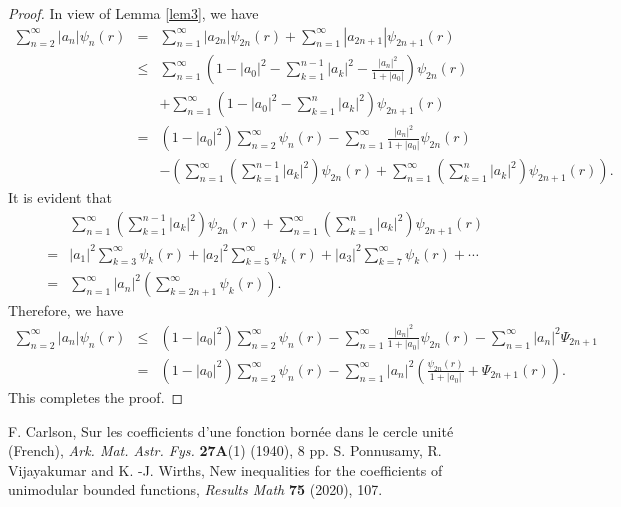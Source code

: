 \documentclass[10pt,a4paper]{amsart}
\newcommand{\beas}{\begin{eqnarray*}}
\newcommand{\eeas}{\end{eqnarray*}}
\begin{document}
\begin{proof} In view of \textrm{Lemma \ref{lem3}}, we have
\beas\sum_{n=2}^\infty |a_n|\psi_n(r)&=&\sum_{n=1}^\infty |a_{2n}|\psi_{2n}(r)+\sum_{n=1}^\infty |a_{2n+1}|\psi_{2n+1}(r)\\[2mm]
&\leq &\sum_{n=1}^\infty \left(1-|a_0|^2-\sum_{k=1}^{n-1}|a_k|^2-\frac{|a_n|^2}{1+|a_0|}\right)\psi_{2n}(r)\\[2mm]
&&+\sum_{n=1}^\infty \left(1-|a_0|^2-\sum_{k=1}^{n}|a_k|^2\right)\psi_{2n+1}(r)\\[2mm]
&=&\left(1-|a_0|^2\right)\sum_{n=2}^\infty \psi_n(r)-\sum_{n=1}^\infty\frac{|a_n|^2}{1+|a_0|}\psi_{2n}(r)\\[2mm]
&&-\left(\sum_{n=1}^\infty\left(\sum_{k=1}^{n-1}|a_k|^2\right) \psi_{2n}(r)+\sum_{n=1}^\infty\left(\sum_{k=1}^{n}|a_k|^2\right) \psi_{2n+1}(r)\right).\eeas
It is evident that 
\beas &&\sum_{n=1}^\infty\left(\sum_{k=1}^{n-1}|a_k|^2\right) \psi_{2n}(r)+\sum_{n=1}^\infty\left(\sum_{k=1}^{n}|a_k|^2\right) \psi_{2n+1}(r)\\[2mm]
&=&|a_1|^2\sum_{k=3}^\infty \psi_k(r)+|a_2|^2\sum_{k=5}^\infty \psi_k(r)+|a_3|^2\sum_{k=7}^\infty \psi_k(r)+\cdots\\[2mm]
&=&\sum_{n=1}^\infty |a_n|^2\left(\sum_{k=2n+1}^\infty \psi_k(r)\right).\eeas
Therefore, we have 
\beas \sum_{n=2}^\infty |a_n|\psi_n(r)&\leq&\left(1-|a_0|^2\right)\sum_{n=2}^\infty \psi_n(r)-\sum_{n=1}^\infty\frac{|a_n|^2}{1+|a_0|}\psi_{2n}(r)-\sum_{n=1}^\infty |a_n|^2\Psi_{2n+1}\\[2mm]
&=&\left(1-|a_0|^2\right)\sum_{n=2}^\infty \psi_n(r)-\sum_{n=1}^\infty|a_n|^2\left(\frac{\psi_{2n}(r)}{1+|a_0|}+\Psi_{2n+1}(r)\right).\eeas
This completes the proof.
\end{proof}

\begin{thebibliography}{99}
 {\sc F. Carlson}, Sur les coefficients d'une fonction born\'ee dans le cercle unit\'e (French), {\it Ark. Mat. Astr. Fys.} {\bf 27A}(1) (1940), 8 pp.
 {\sc S. Ponnusamy, R. Vijayakumar} and {\sc K. -J. Wirths}, New inequalities for the coefficients of unimodular bounded functions, {\it Results Math} {\bf 75} (2020), 107.
\end{thebibliography}
\end{document}
